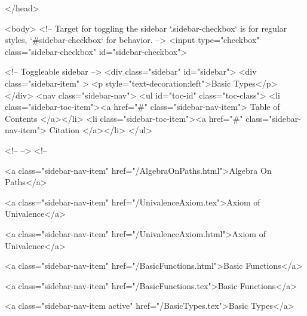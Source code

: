   
</head>




  <body>
    <!-- Target for toggling the sidebar `.sidebar-checkbox` is for regular
     styles, `#sidebar-checkbox` for behavior. -->
<input type="checkbox" class="sidebar-checkbox" id="sidebar-checkbox">

<!-- Toggleable sidebar -->
<div class="sidebar" id="sidebar">
  <div class="sidebar-item" >
    <p style="text-decoration:left">Basic Types</p>
  </div>
  <nav class="sidebar-nav">
    <ul id="toc-id" class="toc-class">
  <li class="sidebar-toc-item"><a href="#" class="sidebar-nav-item"> Table of Contents </a></li>
  <li class="sidebar-toc-item"><a href="#" class="sidebar-nav-item"> Citation </a></li>
</ul>


    <!--  -->
    <!-- 
      
    
      
    
      
    
      
        
      
    
      
        
          <a class="sidebar-nav-item" href="/AlgebraOnPaths.html">Algebra On Paths</a>
        
      
    
      
        
          <a class="sidebar-nav-item" href="/UnivalenceAxiom.tex">Axiom of Univalence</a>
        
      
    
      
        
          <a class="sidebar-nav-item" href="/UnivalenceAxiom.html">Axiom of Univalence</a>
        
      
    
      
        
          <a class="sidebar-nav-item" href="/BasicFunctions.html">Basic Functions</a>
        
      
    
      
        
          <a class="sidebar-nav-item" href="/BasicFunctions.tex">Basic Functions</a>
        
      
    
      
        
          <a class="sidebar-nav-item active" href="/BasicTypes.tex">Basic Types</a>
        
      
    
      
        
